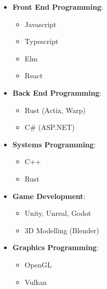 \documentclass[11pt, twoside, a4paper]{article}
\newlength{\cvSideWidth}
\begin{document}
\begin{minipage}[t]{\cvSideWidth}
\begin{center}
        \vspace*{0.5cm}

        \begin{flushleft}
            \begin{itemize}
                \item \textbf{Front End Programming}:
                \begin{itemize}
                    \item Javascript
                    \item Typescript
                    \item Elm
                    \item React
                \end{itemize}
                
                \item \textbf{Back End Programming}:
                \begin{itemize}
                    \item Rust (Actix, Warp)
                    \item C\# (ASP.NET)
                \end{itemize}
                
                \item \textbf{Systems Programming}:
                \begin{itemize}
                    \item C++
                    \item Rust
                \end{itemize}
            
                \item \textbf{Game Development}:
                \begin{itemize}
                    \item Unity, Unreal, Godot
                    \item 3D Modelling (Blender)
                \end{itemize}
            
                \item \textbf{Graphics Programming}:
                \begin{itemize}
                    \item OpenGL
                    \item Vulkan
                \end{itemize}
            

\end{itemize}
\end{flushleft}
\end{center}
\end{minipage}
\end{document}
